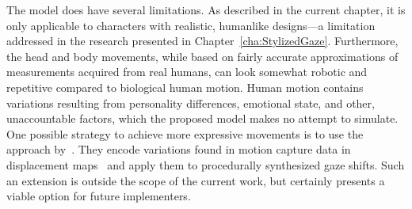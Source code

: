 The model does have several limitations. As described in the current chapter, it is only applicable to characters with realistic, humanlike designs---a limitation addressed in the research presented in Chapter~\ref{cha:StylizedGaze}. Furthermore, the head and body movements, while based on fairly accurate approximations of measurements acquired from real humans, can look somewhat robotic and repetitive compared to biological human motion. Human motion contains variations resulting from personality differences, emotional state, and other, unaccountable factors, which the proposed model makes no attempt to simulate. One possible strategy to achieve more expressive movements is to use the approach by~\citet{lance2010expressive}. They encode variations found in motion capture data in displacement maps~\cite{witkin1995motion} and apply them to procedurally synthesized gaze shifts. Such an extension is outside the scope of the current work, but certainly presents a viable option for future implementers.